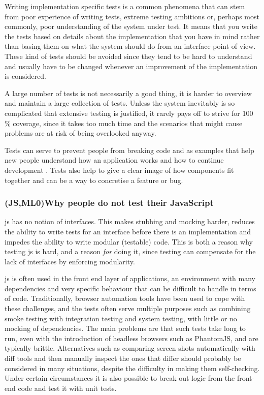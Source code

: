 \documentclass[11pt]{article}
\begin{document}
Writing implementation specific tests is a common phenomena that can stem from poor experience of writing tests, extreme testing ambitions or, perhaps most commonly, poor understanding of the system under test. It means that you write the tests based on details about the implementation that you have in mind rather than basing them on what the system should do from an interface point of view. These kind of tests should be avoided since they tend to be hard to understand and usually have to be changed whenever an improvement of the implementation is considered.

A large number of tests is not necessarily a good thing, it is harder to overview and maintain a large collection of tests. Unless the system inevitably is so complicated that extensive testing is justified, it rarely pays off to strive for 100 \% coverage, since it takes too much time and the scenarios that might cause problems are at risk of being overlooked anyway. \cite[question~28]{Edelstam}

Tests can serve to prevent people from breaking code and as examples that help new people understand how an application works and how to continue development \cite[questions~31-32]{Edelstam}. Tests also help to give a clear image of how components fit together and can be a way to concretise a feature or bug.

\subsubsection{(JS,ML0)Why people do not test their JavaScript}
\label{subsubsec:whynotjs}

\Gls{js} has no notion of interfaces. This makes stubbing and mocking harder, reduces the ability to write tests for an interface before there is an implementation and impedes the ability to write modular (testable) code. This is both a reason why testing \gls{js} is hard, and a reason \emph{for} doing it, since testing can compensate for the lack of interfaces by enforcing modularity.

\Gls{js} is often used in the front end layer of applications, an environment with many dependencies and very specific behaviour that can be difficult to handle in terms of code. Traditionally, browser automation tools have been used to cope with these challenges, and the tests often serve multiple purposes such as combining smoke testing with integration testing and system testing, with little or no mocking of dependencies. The main problems are that such tests take long to run, even with the introduction of headless browsers such as PhantomJS, and are typically brittle. Alternatives such as comparing screen shots automatically with diff tools and then manually inspect the ones that differ should probably be considered in many situations, despite the difficulty in making them self-checking. Under certain circumstances it is also possible to break out logic from the front-end code and test it with unit tests.
\end{document}
